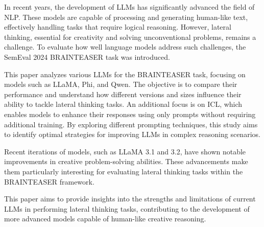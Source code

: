 In recent years, the development of \acp{LLM} has significantly advanced the field of \ac{NLP}. These models are capable of processing and generating human-like text, effectively handling tasks that require logical reasoning. However, lateral thinking, essential for creativity and solving unconventional problems, remains a challenge. To evaluate how well language models address such challenges, the SemEval 2024 BRAINTEASER task was introduced.

This paper analyzes various LLMs for the BRAINTEASER task, focusing on models such as LLaMA, Phi, and Qwen. The objective is to compare their performance and understand how different versions and sizes influence their ability to tackle lateral thinking tasks. An additional focus is on \ac{ICL}, which enables models to enhance their responses using only prompts without requiring additional training. By exploring different prompting techniques, this study aims to identify optimal strategies for improving LLMs in complex reasoning scenarios.

Recent iterations of models, such as LLaMA 3.1 and 3.2, have shown notable improvements in creative problem-solving abilities. These advancements make them particularly interesting for evaluating lateral thinking tasks within the BRAINTEASER framework.

This paper aims to provide insights into the strengths and limitations of current LLMs in performing lateral thinking tasks, contributing to the development of more advanced models capable of human-like creative reasoning.